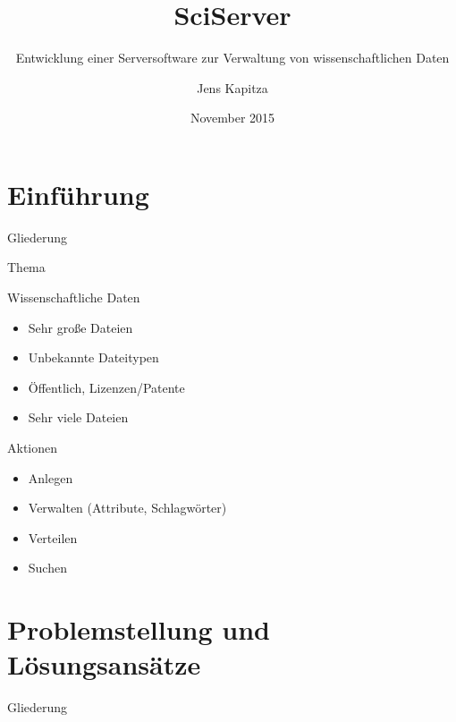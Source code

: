 \documentclass{beamer}
\title{SciServer}
\subtitle{ Entwicklung einer Serversoftware zur Verwaltung von
	wissenschaftlichen Daten}
\author{Jens Kapitza}
\date{November 2015}
\begin{document}
	
	
\section{Einführung}
\begin{frame}
	\titlepage
\end{frame}

\begin{frame}{Gliederung}
  \tableofcontents[subsectionstyle=hide]
\end{frame}


\begin{frame}{Thema}
\begin{block}{Wissenschaftliche Daten}
\begin{itemize}
	\item Sehr große Dateien
	\item Unbekannte Dateitypen
	\item Öffentlich, Lizenzen/Patente
	\item Sehr viele Dateien
\end{itemize}
\end{block}


\begin{block}{Aktionen}
	\begin{itemize}
		\item Anlegen
		\item Verwalten (Attribute, Schlagwörter)
		\item Verteilen
		\item Suchen
	\end{itemize}
\end{block}

\end{frame}

\section{Problemstellung und Lösungsansätze}

\begin{frame}[shrink]{Gliederung}
\end{frame}
\end{document}
